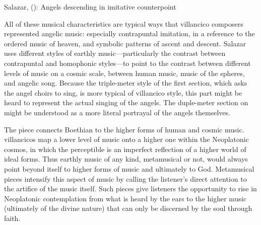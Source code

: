 
{Salazar,  ():
Angels descending in imitative counterpoint}

All of these musical characteristics are typical ways that villancico composers
represented angelic music: especially contrapuntal imitation, in a reference to
the ordered music of heaven, and symbolic patterns of ascent and descent.
Salazar uses different styles of earthly music---particularly the contrast
between contrapuntal and homophonic styles---to point to the contrast between
different levels of music on a cosmic scale, between human music, music of the
spheres, and angelic song.
Because the triple-meter style of the first section, which asks the angel
choirs to sing, is more typical of villancico style, this part might be heard
to represent the actual singing of the angels.
The duple-meter section on  might be understood as a more literal
portrayal of the angels themselves.

The piece connects Boethian  to the higher forms of
human and cosmic music. 
 villancicos map a lower level of music onto a higher one
within the Neoplatonic cosmos, in which the perceptible  is an imperfect reflection of a higher world of ideal forms.
Thus earthly music of any kind, metamusical or not, would always point beyond
itself to higher forms of music and ultimately to God.
Metamusical pieces intensify this aspect of music by calling the listener's
direct attention to the artifice of the music itself.
Such pieces give listeners the opportunity to rise in Neoplatonic contemplation
from what is heard by the ears to the higher music (ultimately of the divine
nature) that can only be discerned by the soul through faith.

